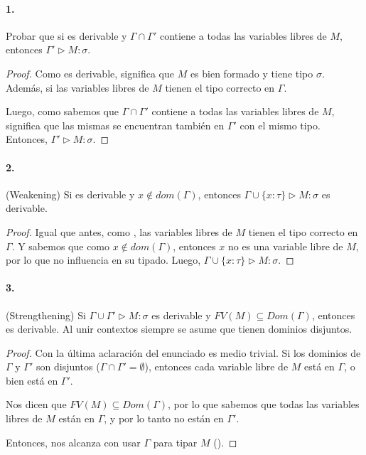 \paragraph{1.} Probar que si  es derivable y $\Gamma \cap \Gamma'$ contiene a todas las variables libres de $M$, entonces $\Gamma' \rhd M : \sigma$.

\begin{proof}
Como  es derivable, significa que $M$ es bien formado y tiene tipo $\sigma$. Además,  si las variables libres de $M$ tienen el tipo correcto en $\Gamma$.

Luego, como sabemos que $\Gamma \cap \Gamma'$ contiene a todas las variables libres de $M$, significa que las mismas se encuentran también en $\Gamma'$ con el mismo tipo. Entonces, $\Gamma' \rhd M : \sigma$.
\end{proof}

\paragraph{2.} (Weakening) Si  es derivable y $x \notin dom(\Gamma)$, entonces $\Gamma \cup \{x:\tau\} \rhd M : \sigma$ es derivable.

\begin{proof}
Igual que antes, como , las variables libres de $M$ tienen el tipo correcto en $\Gamma$. Y sabemos que como $x \notin dom(\Gamma)$, entonces $x$ no es una variable libre de $M$, por lo que no influencia en su tipado. Luego, $\Gamma \cup \{x:\tau\} \rhd M : \sigma$.
\end{proof}

\paragraph{3.} (Strengthening) Si $\Gamma \cup \Gamma' \rhd M : \sigma$ es derivable y $FV(M) \subseteq Dom(\Gamma)$, entonces  es derivable. Al unir contextos siempre se asume que tienen dominios disjuntos.

\begin{proof}
Con la última aclaración del enunciado es medio trivial. Si los dominios de $\Gamma$ y $\Gamma'$ son disjuntos ($\Gamma \cap \Gamma' = \emptyset$), entonces cada variable libre de $M$ está en $\Gamma$, o bien está en $\Gamma'$.

Nos dicen que $FV(M) \subseteq Dom(\Gamma)$, por lo que sabemos que todas las variables libres de $M$ están en $\Gamma$, y por lo tanto no están en $\Gamma'$.

Entonces, nos alcanza con usar $\Gamma$ para tipar $M$ ().
\end{proof}

